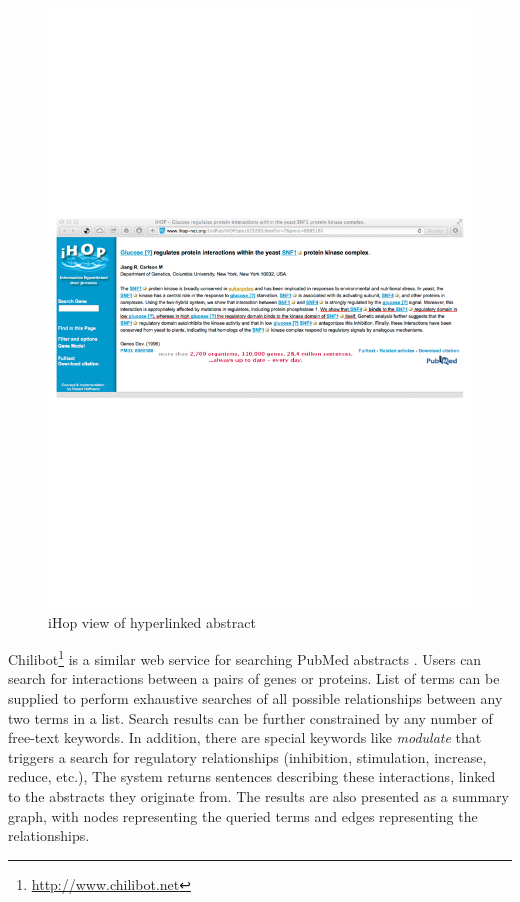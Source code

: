 \begin{figure}
\begin{center}
\includegraphics[scale=0.6]{figures/ihop-3.pdf}
 \caption{iHop view of hyperlinked abstract}
\label{fig:ihop-3}
\end{center}
\end{figure}

Chilibot\footnote{\url{http://www.chilibot.net}} is a similar web service for searching PubMed abstracts \citep{Chen2004Contentrich}.
Users can search for interactions between a pairs of genes or proteins.
List of terms can be supplied to perform exhaustive searches of all possible relationships between any two terms in a list.
Search results can be further constrained by any number of free-text keywords.
In addition, there are special keywords like \emph{modulate} that triggers a search for regulatory relationships (inhibition, stimulation, increase, reduce, etc.),  
The system returns sentences describing these interactions, linked to the abstracts they originate from.
The results are also presented as a summary graph, with nodes representing the queried terms and edges representing the relationships.

